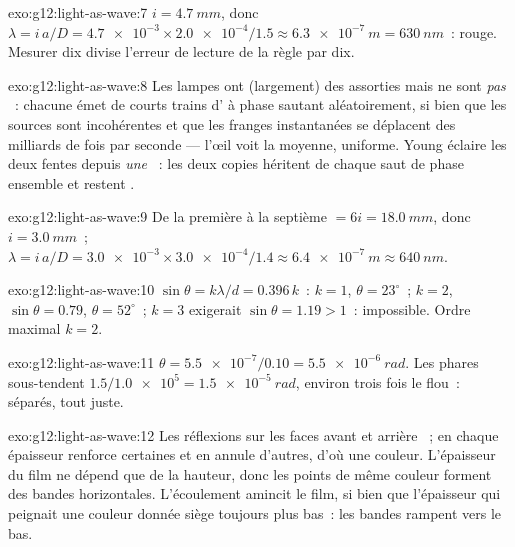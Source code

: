\begin{solution}{exo:g12:light-as-wave:7}
$i = \qty{4.7}{mm}$, donc $\lambda = i\,a/D = \num{4.7e-3} \times
\num{2.0e-4}/1.5 \approx \qty{6.3e-7}{m} = \qty{630}{nm}$~: rouge.
Mesurer dix  divise l'erreur de lecture de la règle
par dix.
\end{solution}

\begin{solution}{exo:g12:light-as-wave:8}
Les lampes ont (largement) des  assorties mais ne sont
\emph{pas }~: chacune émet de courts trains d' à phase
sautant aléatoirement, si bien que les sources sont incohérentes et que
les franges instantanées se déplacent des milliards de fois par seconde
--- l'œil voit la moyenne, uniforme. Young éclaire les deux fentes
depuis \emph{une} ~: les deux copies héritent de chaque saut de
phase ensemble et restent .
\end{solution}

\begin{solution}{exo:g12:light-as-wave:9}
De la première à la septième $= 6i = \qty{18.0}{mm}$, donc
$i = \qty{3.0}{mm}$~;
$\lambda = i\,a/D = \num{3.0e-3} \times \num{3.0e-4}/1.4 \approx
\qty{6.4e-7}{m} \approx \qty{640}{nm}$.
\end{solution}

\begin{solution}{exo:g12:light-as-wave:10}
$\sin\theta = k\lambda/d = 0.396\,k$~: $k = 1$, $\theta = 23^\circ$~;
$k = 2$, $\sin\theta = 0.79$, $\theta = 52^\circ$~; $k = 3$ exigerait
$\sin\theta = 1.19 > 1$~: impossible. Ordre maximal $k = 2$.
\end{solution}

\begin{solution}{exo:g12:light-as-wave:11}
$\theta = \num{5.5e-7}/0.10 = \qty{5.5e-6}{rad}$. Les phares
sous-tendent $1.5/\num{1.0e5} = \qty{1.5e-5}{rad}$, environ trois fois
le flou~: séparés, tout juste.
\end{solution}

\begin{solution}{exo:g12:light-as-wave:12}
Les réflexions sur les faces avant et arrière ~; en
 chaque épaisseur renforce certaines
 et en annule d'autres, d'où une couleur.
L'épaisseur du film ne dépend que de la hauteur, donc les points de
même couleur forment des bandes horizontales. L'écoulement
amincit le film, si bien que l'épaisseur qui peignait une
couleur donnée siège toujours plus bas~: les bandes rampent vers le bas.
\end{solution}

